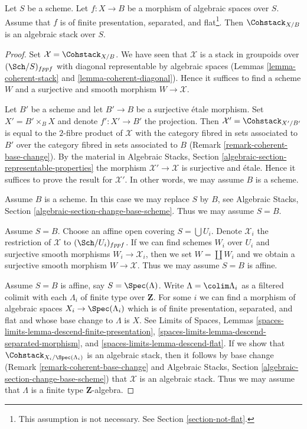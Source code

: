 \begin{theorem}
\label{theorem-coherent-algebraic}
Let $S$ be a scheme. Let $f : X \to B$ be a morphism of algebraic spaces
over $S$. Assume that $f$ is of finite presentation, separated, and
flat\footnote{This assumption is not necessary. See
Section \ref{section-not-flat}.}. Then $\Cohstack_{X/B}$ is
an algebraic stack over $S$.
\end{theorem}

\begin{proof}
Set $\mathcal{X} = \Cohstack_{X/B}$. We have seen that $\mathcal{X}$
is a stack in groupoids over $(\Sch/S)_{fppf}$ with diagonal representable
by algebraic spaces
(Lemmas \ref{lemma-coherent-stack} and \ref{lemma-coherent-diagonal}).
Hence it suffices to find a scheme $W$ and a surjective and smooth
morphism $W \to \mathcal{X}$.

\medskip\noindent
Let $B'$ be a scheme and let $B' \to B$ be a surjective \'etale morphism.
Set $X' = B' \times_B X$ and denote $f' : X' \to B'$ the projection.
Then $\mathcal{X}' = \Cohstack_{X'/B'}$ is equal to the $2$-fibre
product of $\mathcal{X}$ with the category fibred in sets
associated to $B'$ over the category fibred in sets associated to $B$
(Remark \ref{remark-coherent-base-change}). By the material in
Algebraic Stacks, Section \ref{algebraic-section-representable-properties}
the morphism $\mathcal{X}' \to \mathcal{X}$ is surjective and \'etale.
Hence it suffices to prove the result for $\mathcal{X}'$.
In other words, we may assume $B$ is a scheme.

\medskip\noindent
Assume $B$ is a scheme. In this case we may replace $S$ by $B$, see
Algebraic Stacks, Section \ref{algebraic-section-change-base-scheme}.
Thus we may assume $S = B$.

\medskip\noindent
Assume $S = B$. Choose an affine open covering $S = \bigcup U_i$.
Denote $\mathcal{X}_i$ the restriction of $\mathcal{X}$ to
$(\Sch/U_i)_{fppf}$. If we can find schemes $W_i$ over $U_i$ and
surjective smooth morphisms $W_i \to \mathcal{X}_i$, then we
set $W = \coprod W_i$ and we obtain a surjective smooth morphism
$W \to \mathcal{X}$. Thus we may assume $S = B$ is affine.

\medskip\noindent
Assume $S = B$ is affine, say $S = \Spec(\Lambda)$.
Write $\Lambda = \colim \Lambda_i$ as a filtered colimit with each $\Lambda_i$
of finite type over $\mathbf{Z}$. For some $i$ we can find
a morphism of algebraic spaces $X_i \to \Spec(\Lambda_i)$
which is of finite presentation, separated, and flat and whose base change
to $\Lambda$ is $X$. See
Limits of Spaces, Lemmas
\ref{spaces-limits-lemma-descend-finite-presentation},
\ref{spaces-limits-lemma-descend-separated-morphism}, and
\ref{spaces-limits-lemma-descend-flat}.
If we show that $\Cohstack_{X_i/\Spec(\Lambda_i)}$ is an
algebraic stack, then it follows by base change
(Remark \ref{remark-coherent-base-change} and
Algebraic Stacks, Section \ref{algebraic-section-change-base-scheme})
that $\mathcal{X}$ is an algebraic stack.
Thus we may assume that $\Lambda$ is a finite type $\mathbf{Z}$-algebra.


\end{proof}
